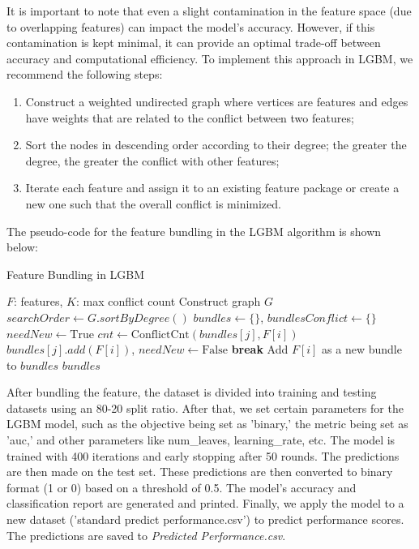 \documentclass{mcmthesis}
\begin{document}
It is important to note that even a slight contamination in the feature space (due to overlapping features) can impact the model's accuracy. However, if this contamination is kept minimal, it can provide an optimal trade-off between accuracy and computational efficiency. To implement this approach in LGBM, we recommend the following steps:
\begin{enumerate}
    \item Construct a weighted undirected graph where vertices are features and edges have weights that are related to the conflict between two features;
    \item Sort the nodes in descending order according to their degree; the greater the degree, the greater the conflict with other features;
    \item Iterate each feature and assign it to an existing feature package or create a new one such that the overall conflict is minimized.
\end{enumerate}
The pseudo-code for the feature bundling in the LGBM algorithm is shown below:
\begin{algorithm}
\caption{Feature Bundling in LGBM}
\label{bundling}
\begin{algorithmic}[1]
\Require $F$: features, $K$: max conflict count
\State Construct graph $G$
\State $searchOrder \gets G.sortByDegree()$
\State $bundles \gets \{\}$, $bundlesConflict \gets \{\}$
    \State $needNew \gets \text{True}$
        \State $cnt \gets \text{ConflictCnt}(bundles[j], F[i])$
            \State $bundles[j].add(F[i])$, $needNew \gets \text{False}$
            \State \textbf{break}
        \EndIf
    \EndFor
        \State Add $F[i]$ as a new bundle to $bundles$
    \EndIf
\EndFor
\Ensure $bundles$
\end{algorithmic}
\end{algorithm}

After bundling the feature, the dataset is divided into training and testing datasets using an 80-20 split ratio. After that, we set certain parameters for the LGBM model, such as the objective being set as 'binary,' the metric being set as 'auc,' and other parameters like num\_leaves, learning\_rate, etc. The model is trained with 400 iterations and early stopping after 50 rounds. The predictions are then made on the test set. These predictions are then converted to binary format (1 or 0) based on a threshold of 0.5. The model's accuracy and classification report are generated and printed. Finally, we apply the model to a new dataset ('standard predict performance.csv') to predict performance scores. The predictions are saved to \emph{Predicted Performance.csv}.
\end{document}
